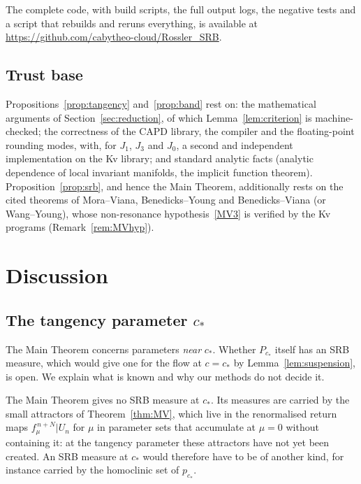 \documentclass[11pt]{amsart}
\theoremstyle{definition}
\theoremstyle{remark}
\newcommand{\cs}{c_*}
\begin{document}
The complete code, with build scripts, the full output logs, the negative tests and a script that rebuilds
and reruns everything, is available at \url{https://github.com/cabytheo-cloud/Rossler_SRB}.

\subsection{Trust base}
Propositions~\ref{prop:tangency} and~\ref{prop:band} rest on: the mathematical arguments of Section~\ref{sec:reduction}, of
which Lemma~\ref{lem:criterion} is machine-checked; the correctness of the CAPD library, the compiler and the
floating-point rounding modes, with, for $J_1$, $J_3$ and $J_0$, a second and independent implementation on
the Kv library; and standard analytic facts (analytic dependence of local invariant manifolds, the implicit
function theorem). Proposition~\ref{prop:srb}, and hence the Main Theorem, additionally rests on the cited theorems of Mora--Viana,
Benedicks--Young and Benedicks--Viana (or Wang--Young), whose non-resonance hypothesis~\ref{MV3} is
verified by the Kv programs (Remark~\ref{rem:MVhyp}).

\section{Discussion}\label{sec:discussion}

\subsection*{The tangency parameter $\cs$}
The Main Theorem concerns parameters \emph{near} $\cs$. Whether $P_{\cs}$ itself has an SRB measure, which would give one
for the flow at $c=\cs$ by Lemma~\ref{lem:suspension}, is open. We explain what is known and why our methods do not
decide it.

The Main Theorem gives no SRB measure at $\cs$. Its measures are carried by the small attractors of
Theorem~\ref{thm:MV}, which live in the renormalised return maps $f_\mu^{\,n+N}|U_n$ for $\mu$ in parameter sets
that accumulate at $\mu=0$ without containing it: at the tangency parameter these attractors have not yet been
created. An SRB measure at $\cs$ would therefore have to be of another kind, for instance carried by the
homoclinic set of $p_{\cs}$.
\end{document}
